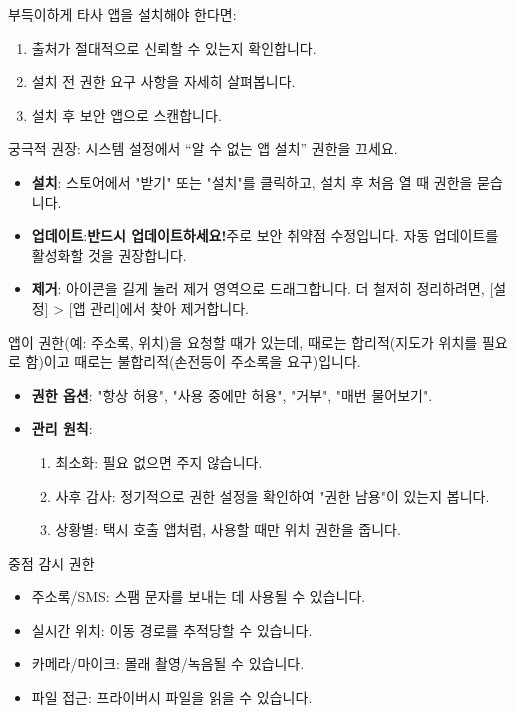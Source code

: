 부득이하게 타사 앱을 설치해야 한다면:

\begin{enumerate}
  \item 출처가 절대적으로 신뢰할 수 있는지 확인합니다.
  \item 설치 전 권한 요구 사항을 자세히 살펴봅니다.
  \item 설치 후 보안 앱으로 스캔합니다.
\end{enumerate}

궁극적 권장: 시스템 설정에서 “알 수 없는 앱 설치” 권한을 끄세요.


\begin{itemize}
  \item \textbf{설치}: 스토어에서 "받기" 또는 "설치"를 클릭하고, 설치 후 처음 열 때 권한을 묻습니다.
  \item \textbf{업데이트}:\textbf{반드시 업데이트하세요!}주로 보안 취약점 수정입니다. 자동 업데이트를 활성화할 것을 권장합니다.
  \item \textbf{제거}: 아이콘을 길게 눌러 제거 영역으로 드래그합니다. 더 철저히 정리하려면, [설정] > [앱 관리]에서 찾아 제거합니다.
\end{itemize}


앱이 권한(예: 주소록, 위치)을 요청할 때가 있는데, 때로는 합리적(지도가 위치를 필요로 함)이고 때로는 불합리적(손전등이 주소록을 요구)입니다.

\begin{itemize}
  \item \textbf{권한 옵션}: "항상 허용", "사용 중에만 허용", "거부", "매번 물어보기".
  \item \textbf{관리 원칙}:
  \begin{enumerate}
    \item 최소화: 필요 없으면 주지 않습니다.
    \item 사후 감사: 정기적으로 권한 설정을 확인하여 "권한 남용"이 있는지 봅니다.
    \item 상황별: 택시 호출 앱처럼, 사용할 때만 위치 권한을 줍니다.
  \end{enumerate}
\end{itemize}

\begin{tcbwarn}{중점 감시 권한}
\begin{itemize}
  \item 주소록/SMS: 스팸 문자를 보내는 데 사용될 수 있습니다.
  \item 실시간 위치: 이동 경로를 추적당할 수 있습니다.
  \item 카메라/마이크: 몰래 촬영/녹음될 수 있습니다.
  \item 파일 접근: 프라이버시 파일을 읽을 수 있습니다.
\end{itemize}

\end{tcbwarn}

